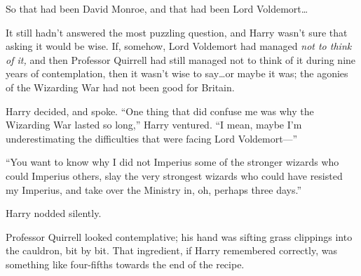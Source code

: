 So that had been David Monroe, and that had been Lord Voldemort…

It still hadn’t answered the most puzzling question, and Harry wasn’t sure that asking it would be wise. If, somehow, Lord Voldemort had managed \emph{not to think of it,} and then Professor Quirrell had still managed not to think of it during nine years of contemplation, then it wasn’t wise to say…or maybe it was; the agonies of the Wizarding War had not been good for Britain.

Harry decided, and spoke. “One thing that did confuse me was why the Wizarding War lasted so long,” Harry ventured. “I mean, maybe I’m underestimating the difficulties that were facing Lord Voldemort—”

“You want to know why I did not Imperius some of the stronger wizards who could Imperius others, slay the very strongest wizards who could have resisted my Imperius, and take over the Ministry in, oh, perhaps three days.”

Harry nodded silently.

Professor Quirrell looked contemplative; his hand was sifting grass clippings into the cauldron, bit by bit. That ingredient, if Harry remembered correctly, was something like four-fifths towards the end of the recipe.

